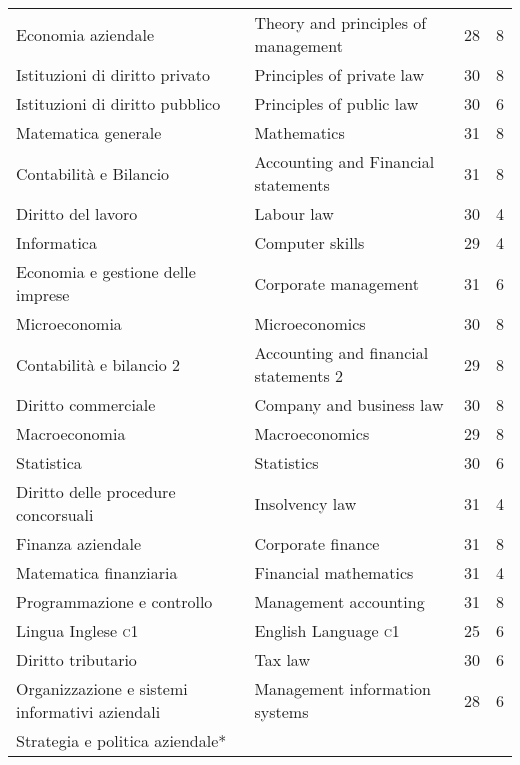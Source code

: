 \documentclass[a4paper,10pt]{article}
\begin{document}
\begin{center}

\tabletail{%
}
\tablelasttail{}

 \begin{supertabular}{p{4.9cm} p{4.9cm} c c}
Economia aziendale&Theory and principles of management& 28 & 8\\
Istituzioni di diritto privato&Principles of private law&30&8\\
 Istituzioni di diritto pubblico
&
 Principles of public law
& 30&
 6
\\
Matematica generale
& Mathematics
&31&8\\
 Contabilit\`a e Bilancio
& Accounting and Financial statements
& 31 & 8\\
 Diritto del lavoro
&
 Labour law
& 30&
4
\\
 Informatica & Computer skills &29& 4
\\
 Economia e gestione delle imprese & Corporate management &31&6
\\
 Microeconomia & Microeconomics &30&8
\\
 Contabilit\`a e bilancio 2 & Accounting and financial statements 2
&29&8 \\
 Diritto commerciale & Company and business law &30&8
\\
 Macroeconomia & Macroeconomics &29&8
\\
 Statistica & Statistics &30&6\\
 Diritto delle procedure concorsuali & Insolvency law &31&4
\\
 Finanza aziendale
& Corporate finance
&31 &8 \\
 Matematica finanziaria & Financial mathematics &31&4
\\
 Programmazione e controllo
& Management accounting &31&8
\\
Lingua Inglese \textsc{c1}& English Language \textsc{c1}& 25&6\\
Diritto tributario & Tax law &30&6
\\
Organizzazione e sistemi informativi aziendali &Management information systems &28&6
\\
 Strategia e politica aziendale*

\end{supertabular}
\end{center}
\end{document}
